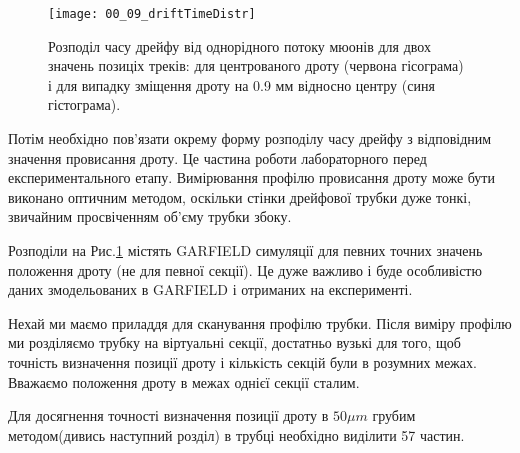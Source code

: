 	\begin{figure}[h!]
	\centering
	\texttt{[image: 00\_09\_driftTimeDistr]}
	\caption{ Розподіл часу дрейфу від однорідного потоку мюонів для двох значень позиціх треків: для центрованого дроту (червона гісограма) і для випадку зміщення дроту на 0.9 мм відносно центру (синя гістограма).}
	\label{fig:DrftTimeDistr_00_09_comp}	
	\end{figure}

	Потім необхідно пов’язати окрему форму розподілу часу дрейфу з відповідним значення провисання дроту. Це частина роботи лабораторного перед експериментального етапу. Вимірювання профілю провисання дроту може бути виконано оптичним методом, оскільки стінки дрейфової трубки дуже тонкі, звичайним просвіченням об'єму трубки збоку.	
	
	Розподіли на Рис.\ref{fig:DrftTimeDistr_00_09_comp} містять GARFIELD симуляції для певних точних значень положення дроту (не для певної секції). Це дуже важливо і буде особливістю даних змодельованих в GARFIELD і отриманих на експерименті. 

	Нехай ми маємо приладдя для сканування профілю трубки. Після виміру профілю ми розділяємо трубку на віртуальні секції, достатньо вузькі для того, щоб точність визначення позиції дроту і кількість секцій були в  розумних межах. Вважаємо положення дроту в межах однієї секції сталим.
	
	
	Для досягнення точності визначення позиції дроту  в $50\mu m$ грубим методом(дивись наступний розділ) в трубці необхідно виділити 57 частин.
	
